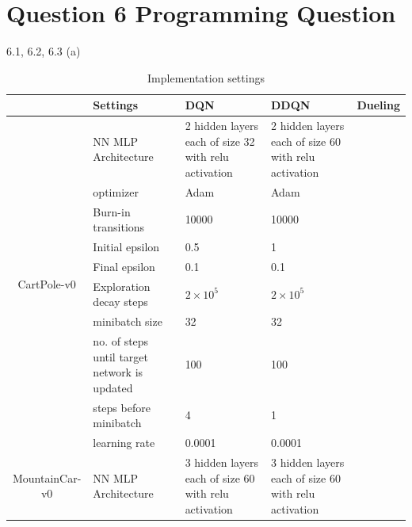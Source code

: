 \documentclass[12pt]{article}
\begin{document}
\section*{Question 6 Programming Question}
    \begin{tcolorbox}[fit,height=22cm, width=\textwidth, blank, borderline={1pt}{-2pt},nobeforeafter]
    {\large 6.1, 6.2, 6.3 (a)}
	\begin{table}[H]
		\centering
		\caption{Implementation settings}
		\begin{tabular}{|c|p{7.785em}|l|l|r|}
			\cline{2-5}    \multicolumn{1}{r|}{} & Settings & \multicolumn{1}{p{7.93em}|}{DQN} & \multicolumn{1}{p{7.93em}|}{DDQN} & \multicolumn{1}{p{7.5em}|}{Dueling} \\
			\hline
			\multirow{10}[20]{*}{\begin{sideways}CartPole-v0\end{sideways}} & NN MLP Architecture  & \multicolumn{1}{p{7.93em}|}{2 hidden layers each of size 32 with relu activation} & \multicolumn{1}{p{7.93em}|}{2 hidden layers each of size 60 with relu activation} &  \\
			\cline{2-5}          & optimizer & \multicolumn{1}{p{7.93em}|}{Adam} & \multicolumn{1}{p{7.93em}|}{Adam} &  \\
			\cline{2-5}          & Burn-in transitions & 10000 & 10000 &  \\
			\cline{2-5}          & Initial epsilon & 0.5   & 1     &  \\
			\cline{2-5}          & Final epsilon & 0.1   & 0.1   &  \\
			\cline{2-5}          & Exploration decay steps & \multicolumn{1}{p{7.93em}|}{$2\times10^5$} & \multicolumn{1}{p{7.93em}|}{$2\times10^5$} &  \\
			\cline{2-5}          & minibatch size & 32    & 32    &  \\
			\cline{2-5}          & no. of steps until target network is updated & 100   & 100   &  \\
			\cline{2-5}          & steps before minibatch & 4     & 1     &  \\
			\cline{2-5}          & learning rate & 0.0001 & 0.0001 &  \\
			\hline
			\multirow{10}[20]{*}{\begin{sideways}MountainCar-v0\end{sideways}} & NN MLP Architecture  & \multicolumn{1}{p{7.93em}|}{3 hidden layers each of size 60 with relu activation} & \multicolumn{1}{p{7.93em}|}{3 hidden layers each of size 60 with relu activation} &  \\

\end{tabular}
\end{table}
\end{tcolorbox}
\end{document}
